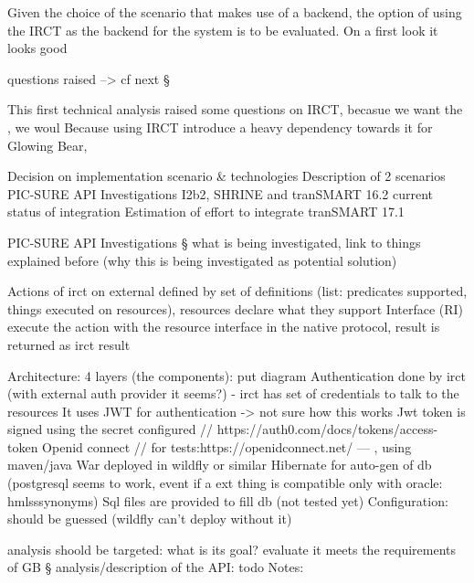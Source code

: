 Given the choice of the scenario that makes use of a backend, the option of using the IRCT as the backend for the system is to be evaluated.
On a first look it looks good 

questions raised --> cf next §

This first technical analysis raised some questions on IRCT, becasue we want the , we woul
Because using IRCT introduce a heavy dependency towards it for Glowing Bear, 


Decision on implementation scenario \& technologies
Description of 2 scenarios
PIC-SURE API Investigations
I2b2, SHRINE and tranSMART 16.2 current status of integration
Estimation of effort to integrate tranSMART 17.1


PIC-SURE API Investigations
§ what is being investigated, link to things explained before (why this is being investigated as potential solution)

Actions of irct on external defined by set of definitions (list: predicates supported, things executed on resources), resources declare what they support
Interface (RI) execute the action with the resource interface in the native protocol, result is returned as irct result

Architecture: 4 layers (the components): put diagram
Authentication done by irct (with external auth provider it seems?) - irct has set of credentials to talk to the resources 
It uses JWT for authentication -> not sure how this works
Jwt token is signed using the secret configured // https://auth0.com/docs/tokens/access-token
Openid connect // for tests:https://openidconnect.net/
---
, using maven/java
War deployed in wildfly or similar
Hibernate for auto-gen of db (postgresql seems to work, event if a ext thing is compatible only with oracle: hmlsssynonyms)
Sql files are provided to fill db (not tested yet)
Configuration: should be guessed (wildfly can’t deploy without it)


analysis shoold be targeted: what is its goal? evaluate it meets the requirements of GB
§ analysis/description of the API: todo %
Notes:

